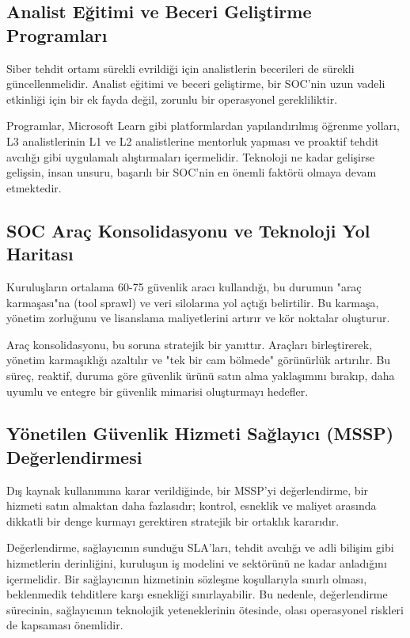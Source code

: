\subsection{Analist Eğitimi ve Beceri Geliştirme Programları}

Siber tehdit ortamı sürekli evrildiği için analistlerin becerileri de sürekli güncellenmelidir. Analist eğitimi ve beceri geliştirme, bir SOC'nin uzun vadeli etkinliği için bir ek fayda değil, zorunlu bir operasyonel gerekliliktir.

Programlar, Microsoft Learn gibi platformlardan yapılandırılmış öğrenme yolları, L3 analistlerinin L1 ve L2 analistlerine mentorluk yapması ve proaktif tehdit avcılığı gibi uygulamalı alıştırmaları içermelidir. Teknoloji ne kadar gelişirse gelişsin, insan unsuru, başarılı bir SOC'nin en önemli faktörü olmaya devam etmektedir.

\subsection{SOC Araç Konsolidasyonu ve Teknoloji Yol Haritası}

Kuruluşların ortalama 60-75 güvenlik aracı kullandığı, bu durumun "araç karmaşası"na (tool sprawl) ve veri silolarına yol açtığı belirtilir. Bu karmaşa, yönetim zorluğunu ve lisanslama maliyetlerini artırır ve kör noktalar oluşturur.

Araç konsolidasyonu, bu soruna stratejik bir yanıttır. Araçları birleştirerek, yönetim karmaşıklığı azaltılır ve "tek bir cam bölmede" görünürlük artırılır. Bu süreç, reaktif, duruma göre güvenlik ürünü satın alma yaklaşımını bırakıp, daha uyumlu ve entegre bir güvenlik mimarisi oluşturmayı hedefler.

\subsection{Yönetilen Güvenlik Hizmeti Sağlayıcı (MSSP) Değerlendirmesi}

Dış kaynak kullanımına karar verildiğinde, bir MSSP'yi değerlendirme, bir hizmeti satın almaktan daha fazlasıdır; kontrol, esneklik ve maliyet arasında dikkatli bir denge kurmayı gerektiren stratejik bir ortaklık kararıdır.

Değerlendirme, sağlayıcının sunduğu SLA'ları, tehdit avcılığı ve adli bilişim gibi hizmetlerin derinliğini, kuruluşun iş modelini ve sektörünü ne kadar anladığını içermelidir. Bir sağlayıcının hizmetinin sözleşme koşullarıyla sınırlı olması, beklenmedik tehditlere karşı esnekliği sınırlayabilir. Bu nedenle, değerlendirme sürecinin, sağlayıcının teknolojik yeteneklerinin ötesinde, olası operasyonel riskleri de kapsaması önemlidir.

